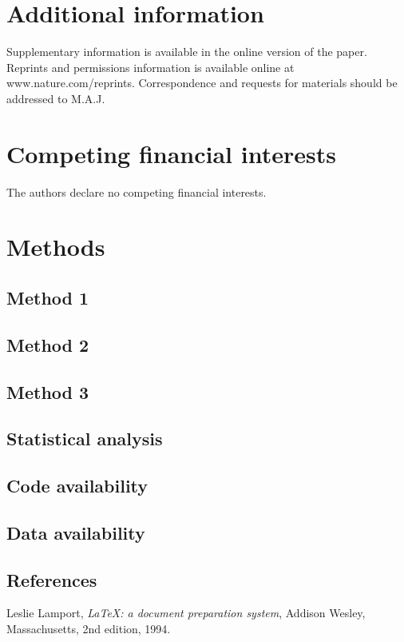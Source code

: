 \documentclass[twocolumn, linenumbers, superscriptaddress]{revtex4-1}
\begin{document}
	\section*{Additional information}
		Supplementary information is available in the online version of the paper.
		Reprints and permissions information is available online at www.nature.com/reprints.
		Correspondence and requests for materials should be addressed to M.A.J.
	
	\section*{Competing financial interests}
		The authors declare no competing financial interests.
	
	\newpage

	\section*{Methods}
		\subsection*{Method 1}
			\blindtext[3]
			
		\subsection*{Method 2}
			\blindtext[3]
			
		\subsection*{Method 3}
			\blindtext[3]
			
		\subsection*{Statistical analysis}
			\blindtext[3]
			
		\subsection*{Code availability}
			\blindtext[3]
			
		\subsection*{Data availability}
			\blindtext[3]

	\begin{thebibliography}{50}
		\section*{References}	
			Leslie Lamport,
			\textit{\LaTeX: a document preparation system},
			Addison Wesley, Massachusetts,
			2nd edition,
			1994.

	\end{thebibliography}
\end{document}
